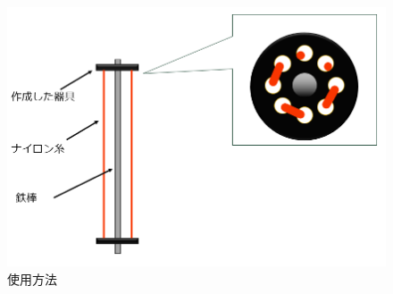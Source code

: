 \begin{figure}[htbp]
  \begin{minipage}[b]{0.49\hsize}
    \centering
    \includegraphics[scale=0.3]{pic/tukau2.PNG}
    \caption{使用方法}
    \label{fig:13}
  \end{minipage} 
  \begin{minipage}[b]{0.49\hsize}
    \centering  %

\end{minipage}
\end{figure}
